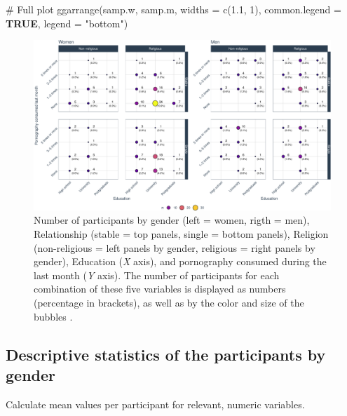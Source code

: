 \documentclass[
  bookmarksnumbered]{article}
\newenvironment{Shaded}{\begin{snugshade}}{\end{snugshade}}
\newcommand{\AttributeTok}[1]{\textcolor[rgb]{0.80,0.80,0.80}{#1}}
\newcommand{\CommentTok}[1]{\textcolor[rgb]{0.50,0.62,0.50}{#1}}
\newcommand{\ConstantTok}[1]{\textcolor[rgb]{0.86,0.64,0.64}{\textbf{#1}}}
\newcommand{\DecValTok}[1]{\textcolor[rgb]{0.86,0.86,0.80}{#1}}
\newcommand{\FloatTok}[1]{\textcolor[rgb]{0.75,0.75,0.82}{#1}}
\newcommand{\FunctionTok}[1]{\textcolor[rgb]{0.94,0.94,0.56}{#1}}
\newcommand{\NormalTok}[1]{\textcolor[rgb]{0.80,0.80,0.80}{#1}}
\newcommand{\StringTok}[1]{\textcolor[rgb]{0.80,0.58,0.58}{#1}}
\begin{document}
\begin{Shaded}
\begin{Highlighting}[]
\CommentTok{\# Full plot}
\FunctionTok{ggarrange}\NormalTok{(samp.w, samp.m,}
          \AttributeTok{widths =} \FunctionTok{c}\NormalTok{(}\FloatTok{1.1}\NormalTok{, }\DecValTok{1}\NormalTok{), }
          \AttributeTok{common.legend =} \ConstantTok{TRUE}\NormalTok{,}
          \AttributeTok{legend =} \StringTok{"bottom"}\NormalTok{)}
\end{Highlighting}
\end{Shaded}

\begin{figure}
\centering
\includegraphics{Deseo_excitacion_sexual_files/figure-latex/donut-plot-1.pdf}
\caption{\label{fig:donut-plot}Number of participants by gender (left = women, rigth = men), Relationship (stable = top panels, single = bottom panels), Religion (non-religious = left panels by gender, religious = right panels by gender), Education (\emph{X} axis), and pornography consumed during the last month (\emph{Y} axis). The number of participants for each combination of these five variables is displayed as numbers (percentage in brackets), as well as by the color and size of the bubbles .}
\end{figure}

\hypertarget{descriptive-statistics-of-the-participants-by-gender}{%
\subsection{Descriptive statistics of the participants by gender}\label{descriptive-statistics-of-the-participants-by-gender}}

Calculate mean values per participant for relevant, numeric variables.
\end{document}
